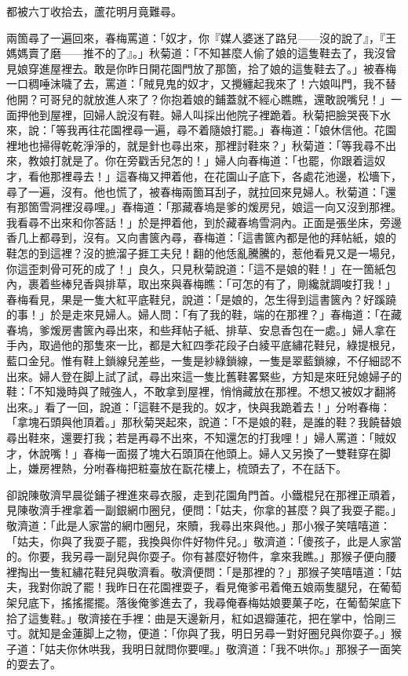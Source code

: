 \begin{myquote}
都被六丁收拾去，蘆花明月竟難尋。
\end{myquote}

兩箇尋了一遍回來，春梅罵道：「奴才，你『媒人婆迷了路兒——沒的說了』，『王媽媽賣了磨——推不的了』。」秋菊道：「不知甚麼人偷了娘的這隻鞋去了，我沒曾見娘穿進屋裡去。敢是你昨日開花園門放了那箇，拾了娘的這隻鞋去了。」被春梅一口稠唾沫噦了去，罵道：「賊見鬼的奴才，又攪纏起我來了！六娘叫門，我不替他開？可哥兒的就放進人來了？你抱着娘的鋪蓋就不經心瞧瞧，還敢說嘴兒！」一面押他到屋裡，回婦人說沒有鞋。婦人叫採出他院子裡跪着。秋菊把臉哭䘮下水來，說：「等我再往花園裡尋一遍，尋不着隨娘打罷。」春梅道：「娘休信他。花園裡地也掃得乾乾淨淨的，就是針也尋出來，那裡討鞋來？」秋菊道：「等我尋不出來，教娘打就是了。你在旁戳舌兒怎的！」婦人向春梅道：「也罷，你跟着這奴才，看他那裡尋去！」這春梅又押着他，在花園山子底下，各處花池邊，松墻下，尋了一遍，沒有。他也慌了，被春梅兩箇耳刮子，就拉回來見婦人。秋菊道：「還有那箇雪洞裡沒尋哩。」春梅道：「那藏春塢是爹的煖房兒，娘這一向又沒到那裡。我看尋不出來和你答話！」於是押着他，到於藏春塢雪洞內。正面是張坐床，旁邊香几上都尋到，沒有。又向書篋內尋，春梅道：「這書篋內都是他的拜帖紙，娘的鞋怎的到這裡？沒的摭溜子捱工夫兒！{}翻的他恁亂騰騰的，惹他看見又是一場兒，你這歪刺骨可死的成了！」良久，只見秋菊說道：「這不是娘的鞋！」{}在一箇紙包內，裹着些棒兒香與排草，取出來與春梅瞧：「可怎的有了，剛纔就調唆打我！」春梅看見，果是一隻大紅平底鞋兒，說道：「是娘的，怎生得到這書篋內？好蹊蹺的事！」於是走來見婦人。婦人問：「有了我的鞋，端的在那裡？」春梅道：「在藏春塢，爹煖房書篋內尋出來，和些拜帖子紙、排草、安息香包在一處。」婦人拿在手內，取過他的那隻來一比，都是大紅四季花段子白綾平底繡花鞋兒，綠提根兒，藍口金兒。惟有鞋上鎖線兒差些，一隻是紗綠鎖線，一隻是翠藍鎖線，不仔細認不出來。婦人登在脚上試了試，尋出來這一隻比舊鞋畧緊些，方知是來旺兒媳婦子的鞋：「不知幾時與了賊強人，不敢拿到屋裡，悄悄藏放在那裡。不想又被奴才翻將出來。」看了一回，說道：「這鞋不是我的。奴才，快與我跪着去！」分咐春梅：「拿塊石頭與他頂着。」那秋菊哭起來，說道：「不是娘的鞋，是誰的鞋？我饒替娘尋出鞋來，還要打我；若是再尋不出來，不知還怎的打我哩！」婦人罵道：「賊奴才，休說嘴！」春梅一面掇了塊大石頭頂在他頭上。婦人又另換了一雙鞋穿在脚上，嫌房裡熱，分咐春梅把粧臺放在翫花樓上，梳頭去了，不在話下。

卻說陳敬濟早晨從鋪子裡進來尋衣服，走到花園角門首。小鐵棍兒在那裡正頑着，見陳敬濟手裡拿着一副銀網巾圈兒，便問：「姑夫，你拿的甚麼？與了我耍子罷。」敬濟道：「此是人家當的網巾圈兒，來贖，我尋出來與他。」那小猴子笑嘻嘻道：「姑夫，你與了我耍子罷，我換與你件好物件兒。」敬濟道：「傻孩子，此是人家當的。你要，我另尋一副兒與你耍子。你有甚麼好物件，拿來我瞧。」那猴子便向腰裡掏出一隻紅繡花鞋兒與敬濟看。敬濟便問：「是那裡的？」那猴子笑嘻嘻道：「姑夫，我對你說了罷！我昨日在花園裡耍子，看見俺爹弔着俺五娘兩隻腿兒，在葡萄架兒底下，搖搖擺擺。{}落後俺爹進去了，我尋俺春梅姑娘要菓子吃，在葡萄架底下拾了這隻鞋。」敬濟接在手裡：曲是天邊新月，紅如退瓣蓮花，把在掌中，恰剛三寸。就知是金蓮脚上之物，便道：「你與了我，明日另尋一對好圈兒與你耍子。」猴子道：「姑夫你休哄我，我明日就問你要哩。」敬濟道：「我不哄你。」那猴子一面笑的耍去了。

